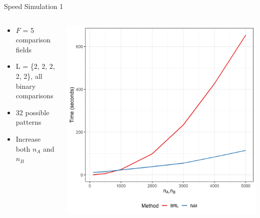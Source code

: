 \documentclass{beamer}
\begin{document}
\begin{frame}{Speed Simulation 1}
	\begin{columns}
		\begin{column}{0.38\textwidth}
			\begin{itemize}
				\item $F$ = 5 comparison fields
				\item L = \{2, 2, 2, 2, 2\}, all binary comparisons
				\item 32 possible patterns
				\item Increase both $n_A$ and $n_B$
			\end{itemize}
		\end{column}
		\begin{column}{0.58\textwidth}
			\includegraphics[width = \textwidth, height = \textwidth ]{../notes/figures/sadinle_speed_plot_slides.png}
		\end{column}
	\end{columns}
\end{frame}
\end{document}

